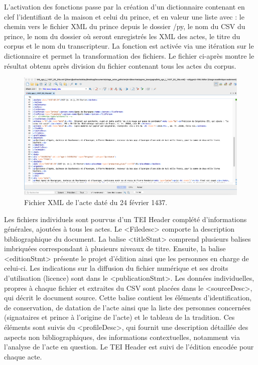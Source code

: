 \par L'activation des fonctions passe par la création d'un dictionnaire contenant en clef l'identifiant de la maison et celui du prince, et en valeur une liste avec : le chemin vers le fichier XML du prince depuis le dossier /py, le nom du CSV du prince, le nom du dossier où seront enregistrés les XML des actes, le titre du corpus et le nom du transcripteur. La fonction est activée via une itération sur le dictionnaire et permet la transformation des fichiers. Le fichier ci-après montre le résultat obtenu après division du fichier contenant tous les actes du corpus. 
\newline 

\begin{figure}[H]
    \centering
    \includegraphics[scale=0.31]{front/images/fichier_indiv.png}
    \caption{Fichier XML de l'acte daté du 24 février 1437.}
    \label{fig:fichier_indiv}
\end{figure}
\newpage 

\par Les fichiers individuels sont pourvus d'un TEI Header complété d'informations générales, ajoutées à tous les actes. Le <Filedesc> comporte la description bibliographique du document. La balise <titleStmt> comprend plusieurs balises imbriquées correspondant à plusieurs niveaux de titre. Ensuite, la balise <editionStmt> présente le projet d'édition ainsi que les personnes en charge de celui-ci. Les indications sur la diffusion du fichier numérique et ses droits d’utilisation (licence) sont dans le <publicationStmt>. Les données individuelles, propres à chaque fichier et extraites du CSV sont placées dans le <sourceDesc>, qui décrit le document source. Cette balise contient les éléments d'identification, de conservation, de datation de l'acte ainsi que la liste des personnes concernées (signataires et prince à l'origine de l'acte) et le tableau de la tradition. Ces éléments sont suivis du <profileDesc>, qui fournit une description détaillée des aspects non bibliographiques, des informations contextuelles, notamment via l'analyse de l'acte en question. Le TEI Header est suivi de l'édition encodée pour chaque acte. 
\newline 

